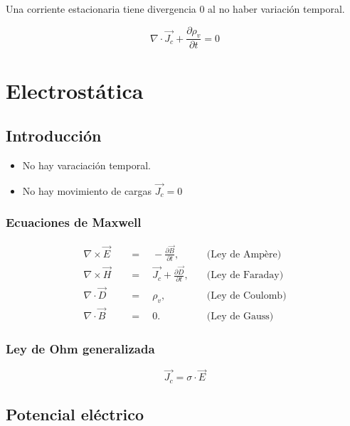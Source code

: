 \documentclass[12pt,a4paper]{article}
\begin{document}
Una corriente estacionaria tiene divergencia 0 al no haber variación temporal.

\[ \nabla \cdot \vec{J_c} + \frac{\partial \rho_v}{\partial t} = 0\]

\section{Electrostática}
\label{sec:electrostatica}

\subsection{Introducción}
\label{sub:introduccion}

\begin{itemize}
		\item No hay varaciación temporal.
		\item No hay movimiento de cargas $ \vec{J_c} = 0 $ 
\end{itemize}

\subsubsection{Ecuaciones de Maxwell}
\label{ssub:ecuaciones_de_maxwell}

\[
\begin{aligned}
\nabla\times\vec{E} \quad & = \quad -\frac{\partial\vec{B}}{\partial t},  & \quad \text{(Ley de Ampère)}   \\[5pt]
\nabla\times\vec{H} \quad & = \quad \vec{J_c} + \frac{\partial\vec{D}}{\partial t},   & \quad \text{(Ley de Faraday)} \\[5pt]
\nabla\cdot\vec{D} \quad & = \quad \rho_v,  & \quad \text{(Ley de Coulomb)} \\[5pt]
\nabla\cdot\vec{B} \quad & = \quad 0. & \quad \text{(Ley de Gauss)}
\end{aligned}
\]

\subsubsection{Ley de Ohm generalizada}
\label{ssub:ley_de_ohm_generalizada}

\[ \vec{J_c} = \sigma \cdot \vec{E} \]

\subsection{Potencial eléctrico}
\label{sub:potencial_electrico}
\end{document}
